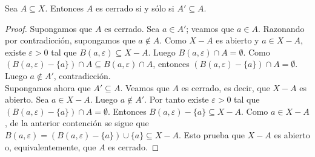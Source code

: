 \begin{teorema}
Sea $A\subseteq X$. Entonces $A$ es cerrado si y sólo si $A'\subseteq A$.
\end{teorema}
\begin{proof}
Supongamos que $A$ es cerrado. Sea $a\in A'$; veamos que $a\in A$. Razonando por contradicción, supongamos que $a\notin A$. Como $X-A$ es abierto y $a\in X-A$, existe $\varepsilon>0$ tal que $B(a,\varepsilon)\subseteq X-A$. Luego $B(a,\varepsilon)\cap A=\emptyset$. Como $(B(a,\varepsilon)-\{a\})\cap A\subseteq B(a,\varepsilon)\cap A$, entonces $(B(a,\varepsilon)-\{a\})\cap A=\emptyset$. Luego $a\notin A'$, contradicción.\\
Supongamos ahora que $A'\subseteq A$. Veamos que $A$ es cerrado, es decir, que $X-A$ es abierto. Sea $a\in X-A$. Luego $a\notin A'$. Por tanto existe $\varepsilon>0$ tal que $(B(a,\varepsilon)-\{a\})\cap A=\emptyset$. Entonces $B(a,\varepsilon)-\{a\}\subseteq X-A$. Como $a\in X-A$, de la anterior contención se sigue que $B(a,\varepsilon)=(B(a,\varepsilon)-\{a\})\cup\{a\}\subseteq X-A$. Esto prueba que $X-A$ es abierto o, equivalentemente, que $A$ es cerrado.
\end{proof}

